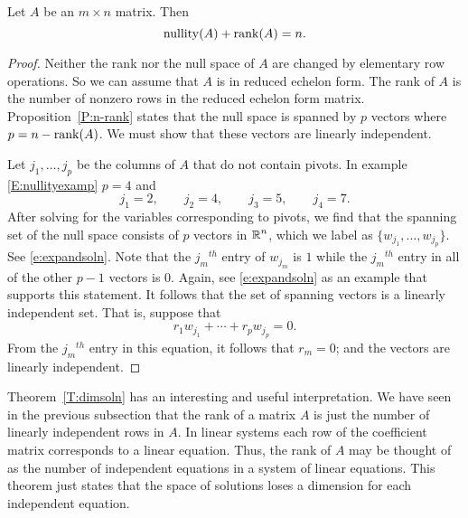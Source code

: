 \documentclass{ximera}
\begin{document}
\begin{theorem}  \label{T:dimsoln}
Let $A$ be an $m\times n$ matrix. Then
\[
{\rm nullity}(A) + {\rm rank}(A) = n.
\]
\end{theorem} 

\begin{proof}	Neither the rank nor the null space of $A$ are changed by
elementary row operations.  So we can assume that $A$ is in reduced
echelon form.  The rank of $A$ is the number of nonzero rows in
the reduced echelon form matrix.  Proposition~\ref{P:n-rank} states that
the null space is spanned by $p$ vectors where $p=n-{\rm rank}(A)$.  We
must show that these vectors are linearly independent.

Let $j_1,\ldots,j_p$ be the columns of $A$ that do not contain pivots.
In example \eqref{E:nullityexamp} $p=4$ and
\[
j_1 = 2, \qquad j_2 = 4, \qquad j_3 = 5, \qquad j_4 = 7.
\]
After solving for the variables corresponding to pivots, we find that
the spanning set of the null space consists of $p$ vectors in $\mbox{$\Bbb{R}$}^n$,
which we label as $\{w_{j_1},\ldots,w_{j_p}\}$.  See \eqref{e:expandsoln}.
Note that the $j_m$$^{th}$  entry of $w_{j_m}$ is $1$ while the
$j_m$$^{th}$ entry in all of the other $p-1$ vectors is $0$.  Again,
see \eqref{e:expandsoln} as an example that supports this statement.  It
follows that the set of spanning vectors is a linearly independent set.
That is, suppose that
\[
r_1w_{j_1} + \cdots + r_pw_{j_p} = 0.
\]
From the $j_m$$^{th}$ entry in this equation, it follows that $r_m=0$;
and the vectors are linearly independent.  \end{proof}

Theorem~\ref{T:dimsoln} has an interesting and useful interpretation.
We have seen in the previous subsection that the rank of a matrix $A$
is just the number of linearly independent rows in $A$.
In linear systems each row of the coefficient matrix corresponds
to a linear equation.  Thus, the rank of $A$ may be thought of as the
number of independent equations in a system of linear equations.
This theorem just states that the space of solutions loses a dimension
for each independent equation.


\EXER

\TEXER
\end{document}
